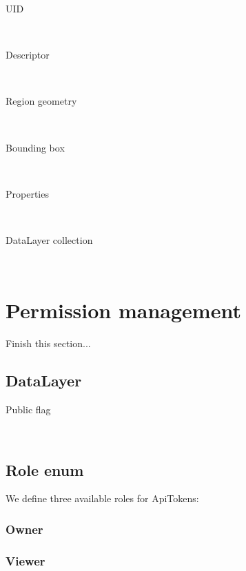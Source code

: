 \begin{description}
\item[UID] \hfill \\
\item[Descriptor] \hfill \\
\item[Region geometry] \hfill \\
\item[Bounding box] \hfill \\
\item[Properties] \hfill \\
\item[DataLayer collection] \hfill \\
\end{description}









\section{Permission management}
Finish this section...

\subsection{DataLayer}
\begin{description}
\item[Public flag] \hfill \\
\end{description}

\subsection{Role enum}
We define three available roles for ApiTokens:

\subsubsection{Owner}
\subsubsection{Viewer}
